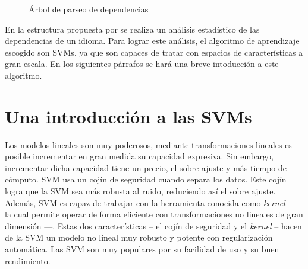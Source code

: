 \begin{figure}[th]
  \scriptsize
   \caption{Árbol de parseo de dependencias}
   \label{fig:deptree}
\end{figure}

En la estructura propuesta por \citeauthor{yamada2003} se realiza un análisis
estadístico de las dependencias de un idioma. Para lograr este análisis, el
algoritmo de aprendizaje escogido son \acp{SVM}, ya que son capaces de tratar
con espacios de características a gran escala. En los siguientes párrafos se
hará una breve intoducción a este algoritmo.

\section{Una introducción a las SVMs}
\label{sec:svmintro}

\nocite{yaser2012} Los modelos lineales son muy poderosos, mediante
transformaciones lineales es posible incrementar en gran medida su capacidad
expresiva. Sin embargo, incrementar dicha capacidad tiene un precio, el sobre
ajuste y más tiempo de cómputo. \ac{SVM} usa un cojín de seguridad cuando separa
los datos. Este cojín logra que la \ac{SVM} sea más robusta al ruido, reduciendo
así el sobre ajuste. Además, \ac{SVM} es capaz de trabajar con la herramienta
conocida como \emph{kernel} --- la cual permite operar de forma eficiente con
transformaciones no lineales de gran dimensión ---. Estas dos características --
el cojín de seguridad y el \emph{kernel} -- hacen de la \ac{SVM} un modelo no
lineal muy robusto y potente con regularización automática. Las \ac{SVM} son muy
populares por su facilidad de uso y su buen rendimiento.

